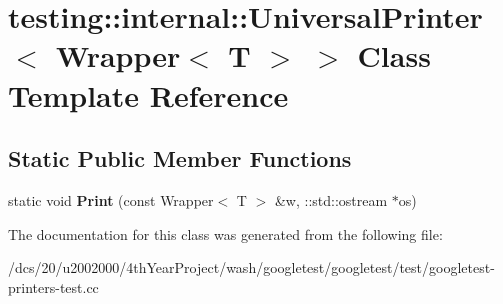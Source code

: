 \hypertarget{classtesting_1_1internal_1_1UniversalPrinter_3_01Wrapper_3_01T_01_4_01_4}{}\section{testing\+:\+:internal\+:\+:Universal\+Printer$<$ Wrapper$<$ T $>$ $>$ Class Template Reference}
\label{classtesting_1_1internal_1_1UniversalPrinter_3_01Wrapper_3_01T_01_4_01_4}
\subsection*{Static Public Member Functions}
\begin{DoxyCompactItemize}
\item 
\mbox{\label{classtesting_1_1internal_1_1UniversalPrinter_3_01Wrapper_3_01T_01_4_01_4_ab5fb8853a93bdb913bf6a8babf9e3d42}} 
static void {\bfseries Print} (const Wrapper$<$ T $>$ \&w, \+::std\+::ostream $\ast$os)
\end{DoxyCompactItemize}


The documentation for this class was generated from the following file\+:\begin{DoxyCompactItemize}
\item 
/dcs/20/u2002000/4th\+Year\+Project/wash/googletest/googletest/test/googletest-\/printers-\/test.\+cc\end{DoxyCompactItemize}
